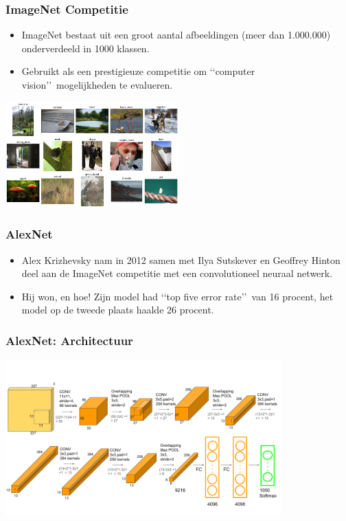 \documentclass[aspectratio=169]{beamer}
\begin{document}
\begin{frame}
\frametitle{ImageNet Competitie}

\begin{itemize}
\item ImageNet bestaat uit een groot aantal afbeeldingen (meer dan 1.000.000) onderverdeeld in 1000 klassen.
\item Gebruikt als een prestigieuze competitie om \lq\lq computer vision\rq\rq\ mogelijkheden te evalueren.
\end{itemize}

\begin{center}
\includegraphics[width=0.50\textwidth]{graphics/imagenet-dogsled}
\end{center}

\end{frame}

\begin{frame}
\frametitle{AlexNet}

\begin{itemize}
	\item Alex Krizhevsky nam in 2012 samen met Ilya Sutskever en Geoffrey Hinton deel aan de ImageNet competitie met een convolutioneel neuraal netwerk.
	\item Hij won, en hoe! Zijn model had \lq\lq top five error rate\rq\rq\ van 16 procent, het model 
	op de tweede plaats haalde 26 procent.
\end{itemize}

\end{frame}

\begin{frame}
\frametitle{AlexNet: Architectuur}
\vspace{-0.5cm}
\begin{center}
	\includegraphics[width=0.80\textwidth]{graphics/alexnet-architecture}
\end{center}
\end{frame}
\end{document}
